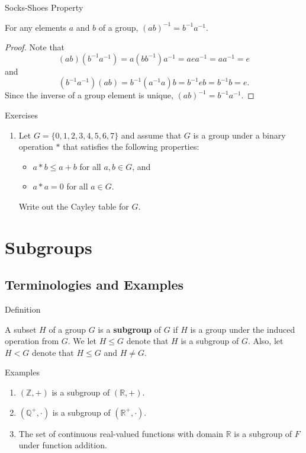 \documentclass{beamer}
\begin{document}
\begin{frame}{Socks-Shoes Property}
\begin{theorem}
For any elements $a$ and $b$ of a group, $(ab)^{-1} = b^{-1}a^{-1}$.
\end{theorem}    
\pause
\begin{proof}
\justifying
Note that
\[
(ab)\left(b^{-1}a^{-1}\right) = a\left(bb^{-1}\right)a^{-1} = aea^{-1} = aa^{-1} = e
\]
and
\[
\left(b^{-1}a^{-1}\right)(ab) = b^{-1}\left(a^{-1}a\right)b = b^{-1}eb = b^{-1}b = e.
\]
Since the inverse of a group element is unique, $(ab)^{-1} = b^{-1}a^{-1}$.
\end{proof}
\end{frame}

\begin{frame}{Exercises}
\begin{enumerate}
\item Let $G = \{0, 1, 2, 3, 4, 5, 6, 7\}$ and assume that $G$ is a group under a binary operation $*$ that satisfies the following properties:
\begin{itemize}
\item $a * b \leq a + b$ for all $a, b \in G$, and
\item $a * a = 0$ for all $a \in G$.
\end{itemize}
Write out the Cayley table for $G$.
\end{enumerate}    
\end{frame}

\section*{Subgroups}

\subsection{Terminologies and Examples}

\begin{frame}{Definition}
\begin{definition}
\justifying
A subset $H$ of a group $G$ is a \textbf{subgroup} of $G$ if $H$ is a group under the induced operation from $G$. We let $H \leq G$ denote that $H$ is a subgroup of $G$. Also, let $H < G$ denote that $H \leq G$ and $H \neq G$.
\end{definition}    
\end{frame}

\begin{frame}{Examples}
\begin{enumerate}
\justifying
\item $(\mathbb{Z}, +)$ is a subgroup of $(\mathbb{R}, +)$.
\item $(\mathbb{Q}^+, \cdot)$ is a subgroup of $(\mathbb{R}^+, \cdot)$.
\item The set of continuous real-valued functions with domain $\mathbb{R}$ is a subgroup of $F$ under function addition.
\end{enumerate}
\end{frame}
\end{document}
